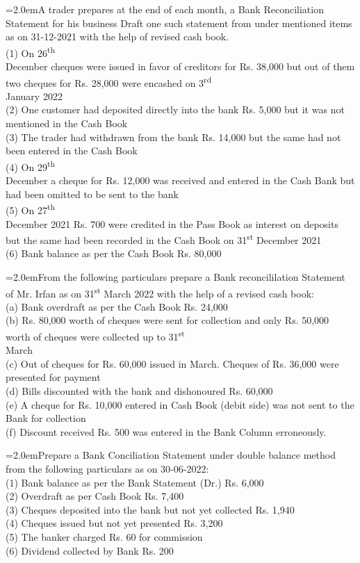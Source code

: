 \documentclass[11pt,a4paper]{article}
\newcommand{\lqn}[2]{\Needspace{6\baselineskip}\par\medskip\noindent\hangindent=2.0em\hangafter=1\makebox[2.0em][l]{\textbf{#1.}}#2\par}
\begin{document}
\lqn{77}{A trader prepares at the end of each month, a Bank Reconciliation Statement for his business Draft one such statement from under mentioned items as on 31-12-2021 with the help of revised cash book.\\
(1) On 26\textsuperscript{th}\\
 December cheques were issued in favor of creditors for Rs. 38,000 but out of them two cheques for Rs. 28,000 were encashed on 3\textsuperscript{rd}\\
 January 2022\\
(2) One customer had deposited directly into the bank Rs. 5,000 but it was not mentioned in the Cash Book\\
(3) The trader had withdrawn from the bank Rs. 14,000 but the same had not been entered in the Cash Book\\
(4) On 29\textsuperscript{th}\\
 December a cheque for Rs. 12,000 was received and entered in the Cash Bank but had been omitted to be sent to the bank\\
(5) On 27\textsuperscript{th}\\
 December 2021 Rs. 700 were credited in the Pass Book as interest on deposits but the same had been recorded in the Cash Book on 31\textsuperscript{st}  December 2021\\
(6) Bank balance as per the Cash Book Rs. 80,000\par
}
\lqn{78}{From the following particulars prepare a Bank reconcililation Statement of Mr. Irfan as on 31\textsuperscript{st}  March 2022 with the help of a revised cash book:\\
(a) Bank overdraft as per the Cash Book Rs. 24,000\\
(b) Rs. 80,000 worth of cheques were sent for collection and only Rs. 50,000 worth of cheques were collected up to 31\textsuperscript{st}\\
 March\\
(c) Out of cheques for Rs. 60,000 issued in March. Cheques of Rs. 36,000 were presented for payment\\
(d) Bills discounted with the bank and dishonoured Rs. 60,000\\
(e) A cheque for Rs. 10,000 entered in Cash Book (debit side) was not sent to the Bank for collection\\
(f) Discount received Rs. 500 was entered in the Bank Column erroneously.\par
}
\lqn{79}{Prepare a Bank Conciliation Statement under double balance method from the following particulars as on 30-06-2022:\\
(1) Bank balance as per the Bank Statement (Dr.) Rs. 6,000\\
(2) Overdraft as per Cash Book Rs. 7,400\\
(3) Cheques deposited into the bank but not yet collected Rs. 1,940\\
(4) Cheques issued but not yet presented Rs. 3,200\\
(5) The banker charged Rs. 60 for commission\\
(6) Dividend collected by Bank Rs. 200\par
}
\end{document}
